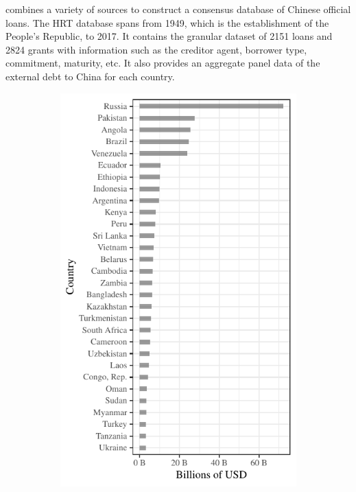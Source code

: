\citet*{Horn-Reinhart-Trebesch-21} combines a variety of sources to construct a consensus database of Chinese official loans.
The HRT database spans from 1949, which is the establishment of the People's Republic, to 2017. It contains the granular dataset of 2151 loans and 2824 grants with information such as the creditor agent, borrower type, commitment, maturity, etc. It also provides an aggregate panel data of the external debt to China for each country.
\begin{figure}[t]
    \centering
    \begin{subfigure}[t]{0.45\textwidth}
        \centering
        \includegraphics[width = \textwidth]{fig/total_debt.pdf}

\end{subfigure}
\end{figure}

